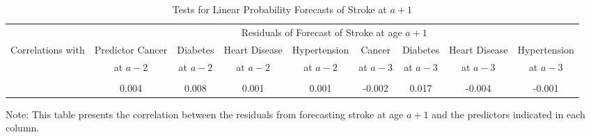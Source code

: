 \begin{landscape}
\begin{table}[H]
\begin{threeparttable}
\caption{Tests for Linear Probability Forecasts of Stroke at $a+1$} \label{table:1storderresidstroke}
\centering
\footnotesize
\begin{tabular}{l *{8}{c}}
\toprule
& \multicolumn{8}{c}{Residuals of Forecast of Stroke at age $a+1$} \\
Correlations with	&	Predictor Cancer &	Diabetes & Heart Disease &	Hypertension &	Cancer	& Diabetes & Heart Disease & Hypertension  \\
                    &	at $a-2$	&	at $a - 2$ & at $a - 2$	& at $a - 2$	& at $a-3$	& at $a - 3$	& at $a - 3$	& at $a - 3$ \\
\midrule \\
&	0.004 &	0.008	&	0.001	&	0.001	&	-0.002	&	0.017 &	-0.004 &	-0.001	\\
\bottomrule
\end{tabular}
\begin{tablenotes}
\footnotesize
\item Note: This table presents the correlation between the residuals from forecasting stroke at age $a+1$ and the predictors indicated in each column.
\end{tablenotes}
\end{threeparttable}
\end{table}
\end{landscape}
